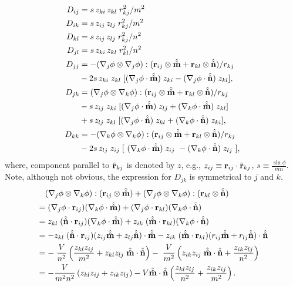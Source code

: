 \documentclass{article}
\begin{document}
\begin{equation}
\begin{split}
D_{ij} &= s \, z_{ki} \, z_{kl} \; r_{kj}^2/m^2   \\
%
D_{ik} &= s \, z_{ij} \, z_{lj} \; r_{kj}^2/m^2 \\
%
D_{kl} &= s \, z_{ij} \, z_{lj} \; r_{kj}^2 / n^2 \\
%
D_{jl} &= s \, z_{ki} \, z_{kl} \; r_{kl}^2/n^2 \\
%
D_{jj}
&= - (\djphi \otimes \djphi)  :
    (\vr_{ij} \otimes \vmhh + \vr_{kl} \otimes \vnhh)
  / r_{kj} \\
&  - 2 s \,
  z_{ki} \; z_{kl} \;
  [
    (\djphi \cdot \vmhh) \; z_{ki}
   -(\djphi \cdot \vnhh) \; z_{kl}
  ], \\
%
D_{jk}
&= (\djphi \otimes \dkphi)  :
    (\vr_{ij} \otimes \vmhh + \vr_{kl} \otimes \vnhh)
 / r_{kj}  \\
&
 - s \,
  z_{ij} \; z_{ki} \;
  [
    (\djphi \cdot \vmhh) \; z_{lj}
   +(\dkphi \cdot \vmhh) \; z_{kl}
  ] \nonumber \\
&
 +s \,
  z_{lj} \; z_{kl} \;
  [
    (\djphi \cdot \vnhh) \; z_{kl}
   +(\dkphi \cdot \vnhh) \; z_{ki}
  ], \\
%
D_{kk}
&= -
    (\dkphi \otimes \dkphi)  :
    (\vr_{ij} \otimes \vmhh + \vr_{kl} \otimes \vnhh)
   /r_{kj} \\
&  - 2 s \,
  z_{lj} \; z_{ij} \;
  [ \
    (\dkphi \cdot \vmhh) \; z_{ij} \
   -(\dkphi \cdot \vnhh) \; z_{lj} \
  ],
\end{split}
\end{equation}
where, component parallel to $\hat{\mathbf{r}}_{kj}$ is denoted by $z$, e.g.,
$z_{ij} \equiv \mathbf{r}_{ij} \cdot \hat{\mathbf{r}}_{kj}$,
%
$s \equiv \frac {\sin \phi} {mn}$.
Note, although not obvious, the expression for $D_{jk}$ is symmetrical to $j$ and $k$.
\begin{align*}
&\ \ \ (\nabla_j \phi \otimes \nabla_k \phi) : (\mathbf{r}_{ij} \otimes \hat{\hat{\mathbf{m}}})
+ (\nabla_j \phi \otimes \nabla_k \phi) : (\mathbf{r}_{kl} \otimes \hat{\hat{\mathbf{n}}}) \\
&= (\nabla_j \phi \cdot \mathbf{r}_{ij})
  (\nabla_k \phi \cdot \hat{\hat{\mathbf{m}}})
+ (\nabla_j \phi \cdot \mathbf{r}_{kl})
  (\nabla_k \phi \cdot \hat{\hat{\mathbf{n}}}) \\
&= z_{kl} \; (\hat{\hat{\mathbf{n}}} \cdot \mathbf{r}_{ij})
  (\nabla_k \phi \cdot \hat{\hat{\mathbf{m}}} )
+  z_{ik} \; (\hat{\hat{\mathbf{m}}} \cdot \mathbf{r}_{kl})
  (\nabla_k \phi \cdot \hat{\hat{\mathbf{n}}} ) \\
&= -z_{kl} \; (\hat{\hat{\mathbf{n}}} \cdot \mathbf{r}_{ij})
   (z_{ij} \hat{\hat{\mathbf{m}}} + z_{lj} \hat{\hat{\mathbf{n}}}) \cdot \hat{\hat{\mathbf{m}}}
-  z_{ik} \; (\hat{\hat{\mathbf{m}}} \cdot \mathbf{r}_{kl})
   (r_{ij} \hat{\hat{\mathbf{m}}} + r_{lj} \hat{\hat{\mathbf{n}}}) \cdot \hat{\hat{\mathbf{n}}} \\
&= - \; \frac{V}{n^2}
  \left(
    \frac {z_{kl} z_{ij}}{m^2} +
    z_{kl} z_{lj} \; \hat{\hat{\mathbf{m}}} \cdot \hat{\hat{\mathbf{n}}}
  \right)
- \; \frac{V}{m^2}
  \left(
    z_{ik} z_{ij} \; \hat{\hat{\mathbf{m}}} \cdot \hat{\hat{\mathbf{n}}} +
    \frac {z_{ik} z_{lj}} {n^2}
  \right) \\
&= - \frac{V}{m^2 n^2}
  \left(
    z_{kl} z_{ij} + z_{ik} z_{lj}
  \right)
   - V \hat{\hat{\mathbf{m}}} \cdot \hat{\hat{\mathbf{n}}}
   \left(
     \frac {z_{kl} z_{lj}} {n^2}
    +\frac {z_{ik} z_{ij}} {m^2}
   \right).
\end{align*}
%
\end{document}
